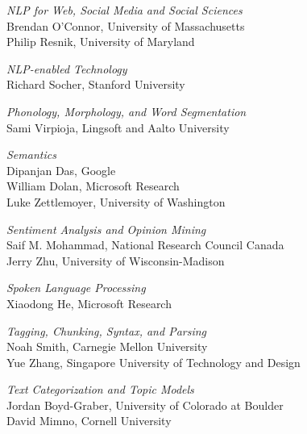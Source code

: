 \emph{NLP for Web, Social Media and Social Sciences} \\
\hspace*{0.2in} Brendan O'Connor, University of Massachusetts \\
\hspace*{0.2in} Philip Resnik, University of Maryland

\emph{NLP-enabled Technology} \\
\hspace*{0.2in} Richard Socher, Stanford University

\emph{Phonology, Morphology, and Word Segmentation} \\
\hspace*{0.2in} Sami Virpioja, Lingsoft and Aalto University

\emph{Semantics} \\
\hspace*{0.2in} Dipanjan Das, Google \\
\hspace*{0.2in} William Dolan, Microsoft Research \\
\hspace*{0.2in} Luke Zettlemoyer, University of Washington

\emph{Sentiment Analysis and Opinion Mining} \\
\hspace*{0.2in} Saif M. Mohammad, National Research Council Canada \\
\hspace*{0.2in} Jerry Zhu, University of Wisconsin-Madison

\emph{Spoken Language Processing} \\
\hspace*{0.2in} Xiaodong He, Microsoft Research

\emph{Tagging, Chunking, Syntax, and Parsing} \\
\hspace*{0.2in} Noah Smith, Carnegie Mellon University \\
\hspace*{0.2in} Yue Zhang, Singapore University of Technology and Design

\emph{Text Categorization and Topic Models} \\
\hspace*{0.2in} Jordan Boyd-Graber, University of Colorado at Boulder \\
\hspace*{0.2in} David Mimno, Cornell University
